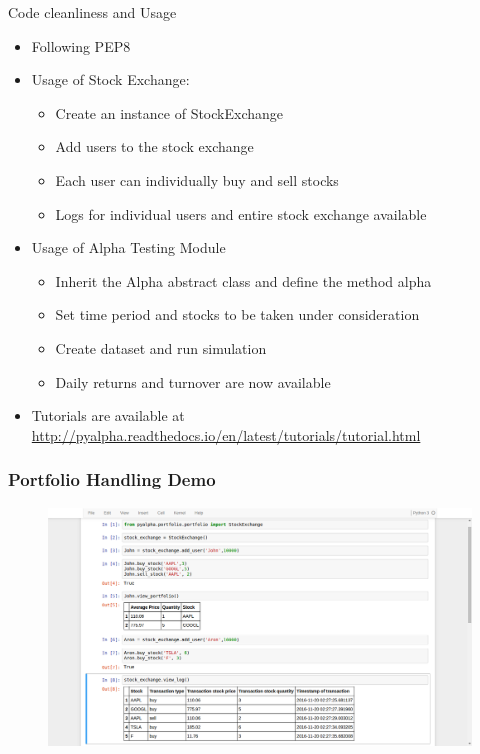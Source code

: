 \documentclass[serif,mathserif]{beamer}
\begin{document}
    \begin{frame}{Code cleanliness and Usage}

        \begin{itemize}
            \item Following PEP8
            \item Usage of Stock Exchange:
            \begin{itemize}
                \item Create an instance of StockExchange
                \item Add users to the stock exchange
                \item Each user can individually buy and sell stocks
                \item Logs for individual users and entire stock exchange available
            \end{itemize}
            \item Usage of Alpha Testing Module
            \begin{itemize}
                \item Inherit the Alpha abstract class and define the method alpha
                \item Set time period and stocks to be taken under consideration
                \item Create dataset and run simulation
                \item Daily returns and turnover are now available
            \end{itemize}
            \item Tutorials are available at \url{http://pyalpha.readthedocs.io/en/latest/tutorials/tutorial.html}
        \end{itemize}

    \end{frame}

    \begin{frame}

        \frametitle{Portfolio Handling Demo}

        \begin{figure}[h]
            \centering
            \includegraphics[width=\linewidth]{portfolio.png}
        \end{figure}

    \end{frame}
\end{document}
